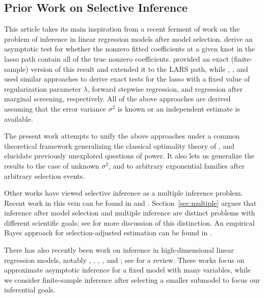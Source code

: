 \documentclass{article}
\theoremstyle{definition}
\begin{document}
\subsection{Prior Work on Selective Inference}\label{sec:prior}

This article takes its main inspiration from a
recent ferment of work on the problem of inference in linear regression models after model selection. \citet{lockhart2014significance} derive an asymptotic test for whether the nonzero fitted coefficients at a given knot in the lasso path contain all of the true nonzero coefficients. \citet{taylor2014post} provided an exact (finite-sample) version of this result and extended it to the LARS path, while \citet{lee2013exact}, \citet{loftus2014significance}, and \citet{lee2014marginal} used similar approaches to derive exact tests for the lasso with a fixed value of regularization parameter $\lambda$, forward stepwise regression, and regression after marginal screening, respectively. All of the above approaches are derived assuming that the error variance $\sigma^2$ is known or an independent estimate is available.

The present work attempts to unify the above approaches under a common theoretical framework generalizing the classical optimality theory of \citet{lehmann1955completeness}, and elucidate previously unexplored questions of power. It also lets us generalize the results to the case of unknown $\sigma^2$, and to arbitrary exponential families after arbitrary selection events.

Other works have viewed selective inference as a multiple inference problem. Recent work in this vein can be found in \citet{berk2013valid} and \citet{barber2014controlling}. Section~\ref{sec:multiple} argues that inference after model selection and multiple inference are distinct problems with different scientific goals; see \citet{benjamini2010simultaneous} for more discussion of this distinction. An empirical Bayes approach for selection-adjusted estimation can be found in \citet{efron2011tweedie}.

There has also recently been work on inference in high-dimensional linear regression models, notably \citet{belloni2011inference}, \citet{belloni2014inference}, \citet{zhang2014confidence}, \citet{javanmard2013hypothesis}, and \citet{van2013asymptotically}; see \citet{dezeure2014high} for a review. These works focus on approximate asymptotic inference for a fixed model with many variables, while we consider finite-sample inference after selecting a smaller submodel to focus our inferential goals.
\end{document}
